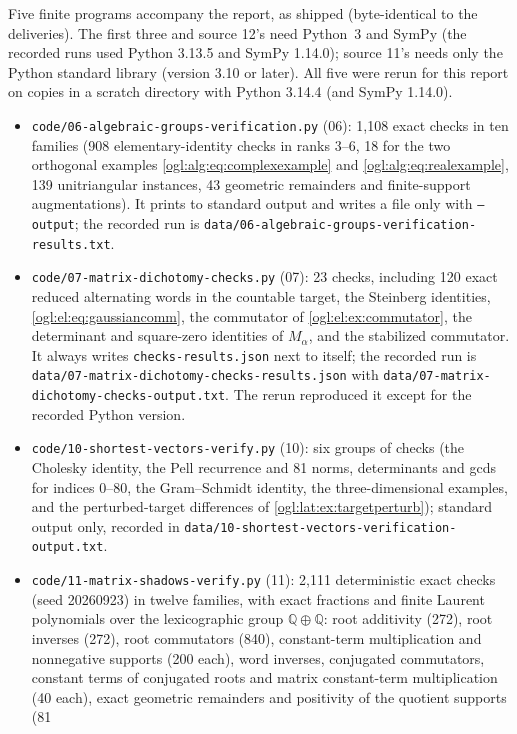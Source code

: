 \documentclass[11pt,oneside]{article}
\numberwithin{equation}{section}
\theoremstyle{definition}
\theoremstyle{remark}
\newcommand{\Q}{\mathbb Q}
\newcommand{\fn}[1]{\nolinkurl{#1}}
\begin{document}
Five finite programs accompany the report, as shipped (byte-identical to the
deliveries). The first three and source 12's need Python~3 and SymPy (the
recorded runs used Python 3.13.5 and SymPy 1.14.0); source 11's needs only the
Python standard library (version 3.10 or later). All five were rerun for this
report on copies in a scratch directory with Python 3.14.4 (and SymPy 1.14.0).
\begin{itemize}[leftmargin=*]
\item \fn{code/06-algebraic-groups-verification.py} (06): 1,108 exact checks in ten
families (908 elementary-identity checks in ranks $3$--$6$, 18 for the two
orthogonal examples \eqref{ogl:alg:eq:complexexample} and
\eqref{ogl:alg:eq:realexample}, 139 unitriangular instances, 43 geometric
remainders and finite-support augmentations). It prints to standard output and
writes a file only with \texttt{--output}; the recorded run is
\fn{data/06-algebraic-groups-verification-results.txt}.
\item \fn{code/07-matrix-dichotomy-checks.py} (07): 23 checks, including 120 exact
reduced alternating words in the countable target, the Steinberg identities,
\eqref{ogl:el:eq:gaussiancomm}, the commutator of \cref{ogl:el:ex:commutator},
the determinant and square-zero identities of $M_\alpha$, and the stabilized
commutator. It always writes \fn{checks-results.json} next to itself; the recorded
run is \fn{data/07-matrix-dichotomy-checks-results.json} with
\fn{data/07-matrix-dichotomy-checks-output.txt}. The rerun reproduced it except
for the recorded Python version.
\item \fn{code/10-shortest-vectors-verify.py} (10): six groups of checks (the
Cholesky identity, the Pell recurrence and 81 norms, determinants and gcds for
indices $0$--$80$, the Gram--Schmidt identity, the three-dimensional examples, and
the perturbed-target differences of \cref{ogl:lat:ex:targetperturb}); standard
output only, recorded in \fn{data/10-shortest-vectors-verification-output.txt}.
\item \fn{code/11-matrix-shadows-verify.py} (11): 2,111 deterministic exact checks
(seed 20260923) in twelve families, with exact fractions and finite Laurent
polynomials over the lexicographic group $\Q\oplus\Q$: root additivity (272),
root inverses (272), root commutators (840), constant-term multiplication and
nonnegative supports (200 each), word inverses, conjugated commutators,
constant terms of conjugated roots and matrix constant-term multiplication (40
each), exact geometric remainders and positivity of the quotient supports (81

\end{itemize}
\end{document}
